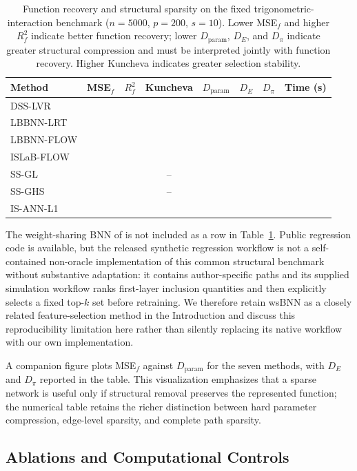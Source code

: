 \begin{table}[t]
\centering
\scriptsize
\setlength{\tabcolsep}{4pt}
\caption{Function recovery and structural sparsity on the fixed trigonometric-interaction benchmark ($n=5000$, $p=200$, $s=10$). Lower MSE$_f$ and higher $R_f^2$ indicate better function recovery; lower $D_{\mathrm{param}}$, $D_E$, and $D_\pi$ indicate greater structural compression and must be interpreted jointly with function recovery. Higher Kuncheva indicates greater selection stability.}
\label{tab:function_sparsity}
\begin{tabular}{lccccccc}
\toprule
Method & MSE$_f$ & $R_f^2$ & Kuncheva & $D_{\mathrm{param}}$ & $D_E$ & $D_\pi$ & Time (s) \\
\midrule
DSS-LVR & & & & & & & \\
LBBNN-LRT & & & & & & & \\
LBBNN-FLOW & & & & & & & \\
ISLaB-FLOW & & & & & & & \\
SS-GL & & & -- & & & & \\
SS-GHS & & & -- & & & & \\
IS-ANN-L1 & & & & & & & \\
\bottomrule
\end{tabular}
\end{table}

The weight-sharing BNN of \citet{mishra2026weightsharing} is not included as a row in Table~\ref{tab:function_sparsity}. Public regression code is available, but the released synthetic regression workflow is not a self-contained non-oracle implementation of this common structural benchmark without substantive adaptation: it contains author-specific paths and its supplied simulation workflow ranks first-layer inclusion quantities and then explicitly selects a fixed top-$k$ set before retraining. We therefore retain wsBNN as a closely related feature-selection method in the Introduction and discuss this reproducibility limitation here rather than silently replacing its native workflow with our own implementation.

A companion figure plots MSE$_f$ against $D_{\mathrm{param}}$ for the seven methods, with $D_E$ and $D_\pi$ reported in the table. This visualization emphasizes that a sparse network is useful only if structural removal preserves the represented function; the numerical table retains the richer distinction between hard parameter compression, edge-level sparsity, and complete path sparsity.

\subsection{Ablations and Computational Controls}
\label{sec:ablation}

